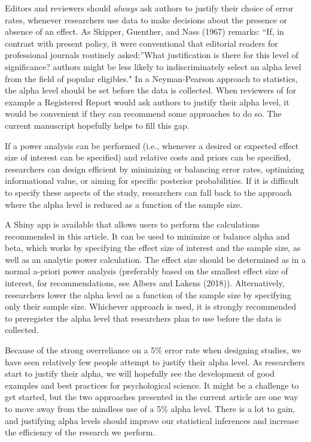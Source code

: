 \documentclass[
  english,
  ,man,floatsintext]{apa6}
\begin{document}
Editors and reviewers should \emph{always} ask authors to justify their choice of error rates, whenever researchers use data to make decisions about the presence or absence of an effect. As Skipper, Guenther, and Nass (1967) remarks: ``If, in contrast with present policy, it were conventional that editorial readers for professional journals routinely asked:''What justification is there for this level of significance? authors might be less likely to indiscriminately select an alpha level from the field of popular eligibles." In a Neyman-Pearson approach to statistics, the alpha level should be set before the data is collected. When reviewers of for example a Registered Report would ask authors to justify their alpha level, it would be convenient if they can recommend some approaches to do so. The current manuscript hopefully helps to fill this gap.

If a power analysis can be performed (i.e., whenever a desired or expected effect size of interest can be specified) and relative costs and priors can be specified, researchers can design efficient by minimizing or balancing error rates, optimizing informational value, or aiming for specific posterior probabilities. If it is difficult to specify these aspects of the study, researchers can fall back to the approach where the alpha level is reduced as a function of the sample size.

A Shiny app is available that allows users to perform the calculations recommended in this article. It can be used to minimize or balance alpha and beta, which works by specifying the effect size of interest and the sample size, as well as an analytic power calculation. The effect size should be determined as in a normal a-priori power analysis (preferably based on the smallest effect size of interest, for recommendations, see Albers and Lakens (2018)). Alternatively, researchers lower the alpha level as a function of the sample size by specifying only their sample size. Whichever approach is used, it is strongly recommended to preregister the alpha level that researchers plan to use before the data is collected.

Because of the strong overreliance on a 5\% error rate when designing studies, we have seen relatively few people attempt to justify their alpha level. As researchers start to justify their alpha, we will hopefully see the development of good examples and best practices for psychological science. It might be a challenge to get started, but the two approaches presented in the current article are one way to move away from the mindless use of a 5\% alpha level. There is a lot to gain, and justifying alpha levels should improve our statistical inferences and increase the efficiency of the research we perform.
\end{document}
